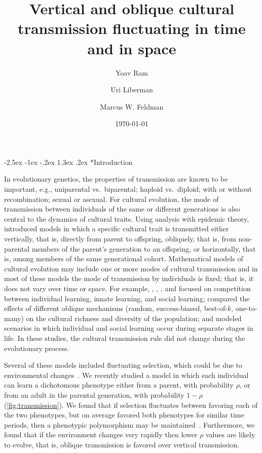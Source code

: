 \documentclass[14pt]{extarticle}
\title{Vertical and oblique cultural transmission fluctuating in time and in space}
\author[a]{Yoav Ram}
\author[b]{Uri Liberman}
\author[a]{Marcus W. Feldman}
\affil[a]{Department of Biology, Stanford University, Stanford, CA}
\affil[b]{School of Mathematical Sciences, Tel Aviv University, Israel}
\date{\today}
\makeatletter
\renewcommand\section{\@startsection {section}{1}{\z@}%
     {-2.5ex \@plus -1ex \@minus -.2ex}%
     {1.3ex \@plus.2ex}%
    {\Large\bfseries}}
\makeatother
\begin{document}
\maketitle


\section*{Introduction}

In evolutionary genetics, the properties of transmission are known to be important, e.g., uniparental vs.\ biparental; haploid vs.\ diploid; with or without recombination; sexual or asexual. For cultural evolution, the mode of transmission between individuals of the same or different generations is also central to the dynamics of cultural traits.
Using analysis with epidemic theory, \citet[ch.~3]{Cavalli-Sforza1981}  introduced models in which a specific cultural trait is transmitted either vertically, that is, directly from parent to offspring, obliquely, that is, from non-parental members of the parent's generation to an offspring, or horizontally, that is, among members of the same generational cohort.
Mathematical models of cultural evolution may include one or more modes of cultural transmission and in most of these models the mode of transmission by individuals is fixed; that is, it does not vary over time {\color{red}or space}.
For example, \cite{Feldman1996}, \cite{Wakano2004}, \cite{Aoki2005}, and \citet{McElreath2008} focused on competition between individual learning, innate learning, and social learning; \citet{Fogarty2017} compared the effects of different oblique mechanisms (random, success-biased, best-of-$k$, one-to-many) on the cultural richness and diversity of the population; and \citet{Aoki2012} modeled scenarios in which individual and social learning occur during separate stages in life.
In these studies, the cultural transmission rule did not change during the evolutionary process.

Several of these models included fluctuating selection, which could be due to environmental changes~\citep[reviewed in][]{Aoki2014}. 
We recently studied a model in which each individual can learn a dichotomous phenotype either from a parent, with probability $\rho$, or from an adult in the parental generation, with probability $1-\rho$ (\autoref{fig:transmission}).
We found that if selection fluctuates between favoring each of the two phenotypes, but on average favored both phenotypes for similar time periods, then a phenotypic polymorphism may be maintained~\citep{Ram2018}.
Furthermore, we found that if the environment changes very rapidly then lower $\rho$ values are likely to evolve, that is, oblique transmission is favored over vertical transmission.
\end{document}
